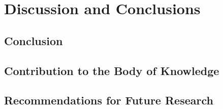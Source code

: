 \chapter{Discussion and Conclusions}
 

\section{Conclusion}
\lipsum[1]

\section{Contribution to the Body of Knowledge}
\lipsum[1]


\section{Recommendations for Future Research}
\lipsum[1]

 